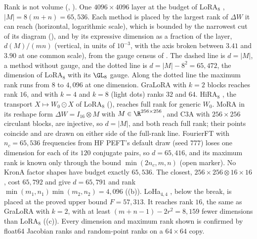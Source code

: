 Rank is not volume (, ). One $4096\times4096$ layer at the budget of
LoRA$_8$ \citep{hu2021lora}, $\lvert M\rvert=8(m+n)=65{,}536$. Each method is placed by the largest rank of $\Delta W$ it
can reach (horizontal, logarithmic scale), which is bounded by the narrowest cut of its diagram
(), and by its expressive dimension as a fraction of the layer, $d(M)/(mn)$ (vertical, in units of
$10^{-3}$, with the axis broken between $3.41$ and $3.90$ at one common scale), from the gauge census of
. The dashed line is $d=\lvert M\rvert$, a method without gauge, and the dotted line is
$d=\lvert M\rvert-8^2=65{,}472$, the dimension of LoRA$_8$ with its $\GL_8$ gauge. Along the dotted line the maximum rank
runs from $8$ to $4{,}096$ at one dimension. GraLoRA \citep{jung2025gralora} with $k=2$ blocks reaches rank $16$, and with
$k=4$ and $k=8$ (light dots) ranks $32$ and $64$. HiRA$_8$ \citep{huang2025hira}, the transport $X\mapsto W_0\odot X$ of
LoRA$_8$ (), reaches full rank for generic $W_0$. MoRA \citep{jiang2024mora} in its reshape
form $\Delta W=I_{16}\otimes M$ with $M\in\R^{256\times256}$, and C3A \citep{chen2024parameter} with $256\times256$
circulant blocks, are injective, so $d=\lvert M\rvert$, and both reach full rank; their points coincide and are drawn on
either side of the full-rank line. FourierFT \citep{gao2024parameter} with $n_c=65{,}536$ frequencies from HF PEFT's
default draw (seed $777$) loses one dimension for each of its $120$ conjugate pairs, so $d=65{,}416$, and its maximum
rank is known only through the bound $\min(2n_c,m,n)$ (open marker). No KronA \citep{edalati2022krona} factor shapes have
budget exactly $65{,}536$. The closest, $256\times256\otimes16\times16$, cost $65{,}792$ and give $d=65{,}791$ and rank
$\min(m_1,n_1)\min(m_2,n_2)=4{,}096$ ((b)). LoHa$_{4,4}$ \citep{hyeonwoo2021fedpara}, below the
break, is placed at the proved upper bound $F=57{,}313$. It reaches rank $16$, the same as GraLoRA with $k=2$, with at
least $(m+n-1)-2r^2=8{,}159$ fewer dimensions than LoRA$_8$ ((c)). Every dimension and
maximum rank shown is confirmed by float64 Jacobian ranks and random-point ranks on a $64\times64$ copy.
